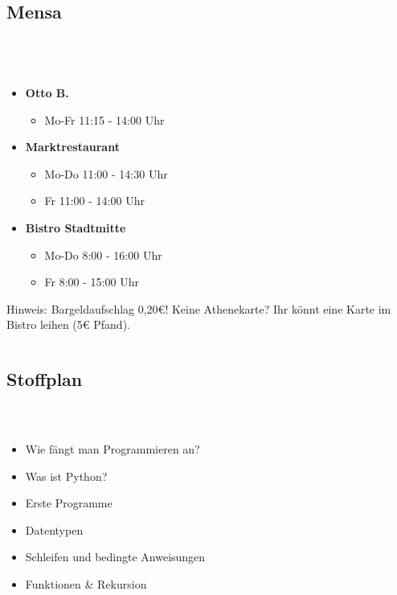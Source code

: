 \subsection{Mensa}
\begin{frame}
	\frametitle{\insertsectionhead \\ {\small \insertsubsectionhead}}
	\begin{columns}
		\begin{column}{5cm}
			\begin{itemize}
				\item \textbf{Otto B.}
				\begin{itemize}
					\item Mo-Fr 11:15 - 14:00 Uhr
				\end{itemize}
				\item \textbf{Marktrestaurant}
				\begin{itemize}
					\item Mo-Do 11:00 - 14:30 Uhr
					\item Fr 11:00 - 14:00 Uhr
				\end{itemize}
				\item \textbf{Bistro Stadtmitte }
				\begin{itemize}
					\item Mo-Do 8:00 - 16:00 Uhr
					\item Fr 8:00 - 15:00 Uhr
				\end{itemize}
			\end{itemize}
			\begin{block}{Hinweis:}
				Bargeldaufschlag 0,20€! Keine Athenekarte? Ihr könnt eine Karte im Bistro leihen (5€ Pfand).
			\end{block}
		\end{column}
		\begin{column}{7.2cm}
			\vspace{-2.5ex}
		\end{column}
	\end{columns}
\end{frame}


\subsection{Stoffplan}
\begin{frame}
	\frametitle{\insertsectionhead \\ {\small \insertsubsectionhead}}
	\begin{itemize}
		\item Wie fängt man Programmieren an?
		\item Was ist Python?
		\item Erste Programme
		\item Datentypen
		\item Schleifen und bedingte Anweisungen
		\item Funktionen \& Rekursion
	\end{itemize}
\end{frame}

